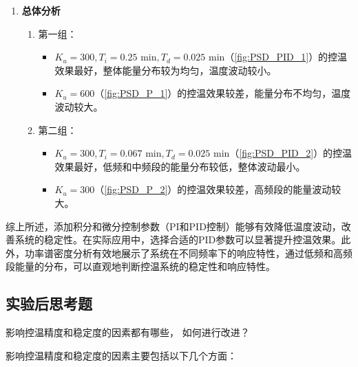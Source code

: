 \documentclass[dvipsnames, svgnames,a4paper,11pt]{article}
\begin{document}
\begin{enumerate}
\begin{enumerate}
            \item \textbf{总体分析}
            \begin{enumerate}
                \item 第一组：
                \begin{itemize}
                    \item \( K_u = 300, T_i = 0.25 \text{ min}, T_d = 0.025 \text{ min} \)（\cref{fig:PSD_PID_1}）的控温效果最好，整体能量分布较为均匀，温度波动较小。
                    \item \( K_u = 600 \)（\cref{fig:PSD_P_1}）的控温效果较差，能量分布不均匀，温度波动较大。
                \end{itemize}
                
                \item 第二组：
                \begin{itemize}
                    \item \( K_u = 300, T_i = 0.067 \text{ min}, T_d = 0.025 \text{ min} \)（\cref{fig:PSD_PID_2}）的控温效果最好，低频和中频段的能量分布较低，整体波动最小。
                    \item \( K_u = 300 \)（\cref{fig:PSD_P_2}）的控温效果较差，高频段的能量波动较大。
                \end{itemize}
            \end{enumerate}
        \end{enumerate}
        
        综上所述，添加积分和微分控制参数（PI和PID控制）能够有效降低温度波动，改善系统的稳定性。在实际应用中，选择合适的PID参数可以显著提升控温效果。此外，功率谱密度分析有效地展示了系统在不同频率下的响应特性，通过低频和高频段能量的分布，可以直观地判断控温系统的稳定性和响应特性。
        

    \end{enumerate}





		

\subsection{实验后思考题}	
	
    \begin{question}
        影响控温精度和稳定度的因素都有哪些， 如何进行改进？
    \end{question}

    影响控温精度和稳定度的因素主要包括以下几个方面：
\end{document}
